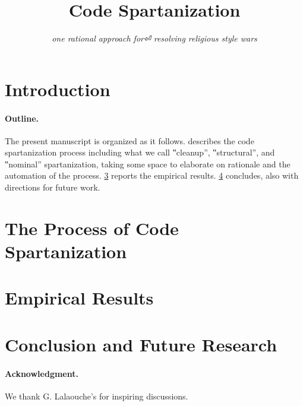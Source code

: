 \documentclass[preprint,10pt,nonatbib]{sigplanconf}
\title{Code Spartanization}
\subtitle{\scriptsize \emph{one rational approach for⏎ resolving religious style wars}}
\begin{document}
\maketitle

\def\ignore#1{}
\def\gal{\marginpar[G$⇒$]{$⇐$G}}
\def\yossi{\marginpar[Y$⇒$]{$⇐$Y}}
\def\matteo{\marginpar[M$⇒$]{$⇐$M}}

\begin{abstract}
  
\end{abstract}

\section{Introduction}


\paragraph{Outline.} The present manuscript is organized as it follows. 
 describes the code spartanization
process including what we call ‟cleanup”, ‟structural”, and ‟nominal”
spartanization, taking some space to elaborate on rationale and the automation
of the process. \cref{section:empirical} reports the empirical results.
\cref{section:zz} concludes, also with directions for future work. 

\section{The Process of Code Spartanization}
\label{section:process}


\section{Empirical Results}
\label{section:empirical}


\section{Conclusion and Future Research}
\label{section:zz}


\paragraph{Acknowledgment.} We thank G. Lalaouche's for inspiring discussions.

\balance
\small

\end{document}
